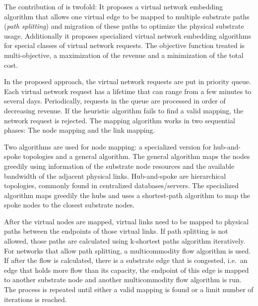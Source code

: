 The contribution of \citet{Yu2008} is twofold: It proposes a virtual network embedding algorithm that allows one virtual edge to be mapped to multiple substrate paths (\emph{path splitting}) and migration of these paths to optimize the physical substrate usage. Additionally it proposes specialized virtual network embedding algorithms for special classes of virtual network requests. The objective function treated is multi-objective, a maximization of the revenue and a minimization of the total cost.

In the proposed approach, the virtual network requests are put in priority queue. Each virtual network request has a lifetime that can range from a few minutes to several days. Periodically, requests in the queue are processed in order of decreasing revenue. If the heuristic algorithm fails to find a valid mapping, the network request is rejected. The mapping algorithm works in two sequential phases: The node mapping and the link mapping.

Two algorithms are used for node mapping: a specialized version for hub-and-spoke topologies and a general algorithm. The general algorithm maps the nodes greedily using information of the substrate node resources and the available bandwidth of the adjacent physical links. Hub-and-spoke are hierarchical topologies, commonly found in centralized databases/servers. The specialized algorithm maps greedily the hubs and uses a shortest-path algorithm to map the spoke nodes to the closest substrate nodes.

After the virtual nodes are mapped, virtual links need to be mapped to physical paths between the endpoints of those virtual links. If path splitting is not allowed, those paths are calculated using k-shortest paths algorithm iteratively. For networks that allow path splitting, a multicommodity flow algorithm is used. If after the flow is calculated, there is a substrate edge that is congested, i.e.\ an edge that holds more flow than its capacity, the endpoint of this edge is mapped to another substrate node and another multicommodity flow algorithm is run. The process is repeated until either a valid mapping is found or a limit number of iterations is reached.


